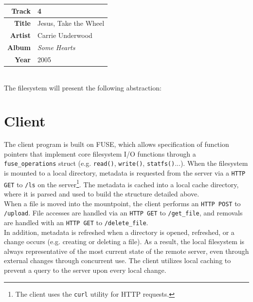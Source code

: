 \documentclass{article}
\begin{document}
	\begin{tabular}{| r | l |}
		\hline
		\textbf{Track} & 4 \\ \hline
		\textbf{Title} & Jesus, Take the Wheel \\ \hline
		\textbf{Artist} & Carrie Underwood \\ \hline
		\textbf{Album} & \textit{Some Hearts} \\ \hline 
		\textbf{Year} & 2005 \\ \hline
	\end{tabular} \\
	
	\noindent The filesystem will present the following abstraction: \\ 
	
		
	\section{Client}
	The client program is built on FUSE, which allows specification of function pointers that implement core filesystem I/O functions through a \texttt{fuse\_operations} struct (e.g. \texttt{read()}, \texttt{write()}, \texttt{statfs()}...). When the filesystem is mounted to a local directory, metadata is requested from the server via a \texttt{HTTP GET} to \texttt{/ls} on the server\footnote{The client uses the \texttt{curl} utility for HTTP requests.}. The metadata is cached into a local cache directory, where it is parsed and used to build the structure detailed above. \\
	
	\noindent When a file is moved into the mountpoint, the client performs an \texttt{HTTP POST} to \texttt{/upload}. File accesses are handled via an \texttt{HTTP GET} to \texttt{/get\_file}, and removals are handled with an \texttt{HTTP GET} to \texttt{/delete\_file}. \\
	
	\noindent In addition, metadata is refreshed when a directory is opened, refreshed, or a change occurs (e.g. creating or deleting a file). As a result, the local filesystem is always representative of the most current state of the remote server, even through external changes through concurrent use. The client utilizes local caching to prevent a query to the server upon every local change.
	
\end{document}
